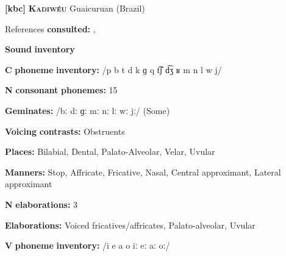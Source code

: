 \begin{styleBody}
\textbf{[kbc]}   \textbf{\textsc{Kadiwéu}}  Guaicuruan (Brazil)
\end{styleBody}

\begin{styleBody}
References \textbf{consulted:} \citet{Braggio1981}, \citet{Sandalo1997}
\end{styleBody}

\begin{styleBody}
\textbf{Sound} \textbf{inventory}
\end{styleBody}

\begin{styleBody}
\textbf{C} \textbf{phoneme} \textbf{inventory:} /p b t d k ɡ q t͡ʃ d͡ʒ ʁ m n l w j/
\end{styleBody}

\begin{styleBody}
\textbf{N} \textbf{consonant} \textbf{phonemes:} 15
\end{styleBody}

\begin{styleBody}
\textbf{Geminates:} /bː dː ɡː mː nː lː wː jː/ (Some)
\end{styleBody}

\begin{styleBody}
\textbf{Voicing} \textbf{contrasts:} Obstruents
\end{styleBody}

\begin{styleBody}
\textbf{Places:} Bilabial, Dental, Palato-Alveolar, Velar, Uvular
\end{styleBody}

\begin{styleBody}
\textbf{Manners:} Stop, Affricate, Fricative, Nasal, Central approximant, Lateral approximant
\end{styleBody}

\begin{styleBody}
\textbf{N} \textbf{elaborations:} 3
\end{styleBody}

\begin{styleBody}
\textbf{Elaborations:} Voiced fricatives/affricates, Palato-alveolar, Uvular
\end{styleBody}

\begin{styleBody}
\textbf{V} \textbf{phoneme} \textbf{inventory:} /i e a o iː eː aː oː/
\end{styleBody}

